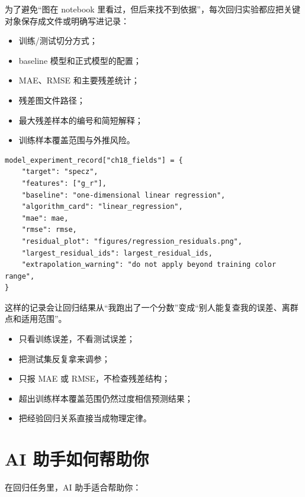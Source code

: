 为了避免“图在 notebook 里看过，但后来找不到依据”，每次回归实验都应把关键对象保存成文件或明确写进记录：

\begin{itemize}
    \item 训练/测试切分方式；
    \item baseline 模型和正式模型的配置；
    \item MAE、RMSE 和主要残差统计；
    \item 残差图文件路径；
    \item 最大残差样本的编号和简短解释；
    \item 训练样本覆盖范围与外推风险。
\end{itemize}

\begin{examplebox}
\begin{lstlisting}[style=pythonstyle]
model_experiment_record["ch18_fields"] = {
    "target": "specz",
    "features": ["g_r"],
    "baseline": "one-dimensional linear regression",
    "algorithm_card": "linear_regression",
    "mae": mae,
    "rmse": rmse,
    "residual_plot": "figures/regression_residuals.png",
    "largest_residual_ids": largest_residual_ids,
    "extrapolation_warning": "do not apply beyond training color range",
}
\end{lstlisting}
\end{examplebox}

这样的记录会让回归结果从“我跑出了一个分数”变成“别人能复查我的误差、离群点和适用范围”。

\begin{warnbox}[回归中的常见误区]
\begin{itemize}
    \item 只看训练误差，不看测试误差；
    \item 把测试集反复拿来调参；
    \item 只报 MAE 或 RMSE，不检查残差结构；
    \item 超出训练样本覆盖范围仍然过度相信预测结果；
    \item 把经验回归关系直接当成物理定律。
\end{itemize}
\end{warnbox}

\section{AI 助手如何帮助你}

在回归任务里，AI 助手适合帮助你：

